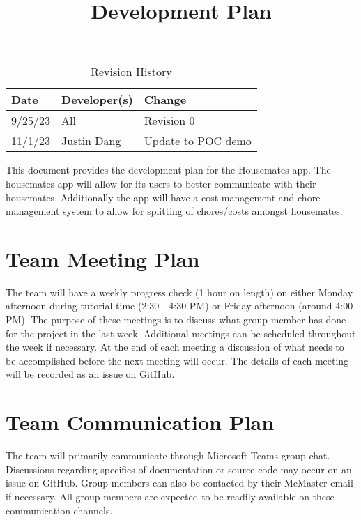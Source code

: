 \documentclass{article}
\title{Development Plan\\\progname}
\author{\authname}
\date{}
\begin{document}
\maketitle

\begin{table}[hp]
\caption{Revision History} \label{TblRevisionHistory}
\begin{tabularx}{\textwidth}{llX}
\toprule
\textbf{Date} & \textbf{Developer(s)} & \textbf{Change}\\
\midrule
9/25/23 & All & Revision 0\\
11/1/23 & Justin Dang & Update to POC demo\\
\bottomrule
\end{tabularx}
\end{table}


This document provides the development plan for the Housemates app. The housemates app will allow for its users to better communicate with their housemates.  Additionally the app will have a cost management and chore management system to allow for splitting of chores/costs amongst housemates.

\section{Team Meeting Plan}

The team will have a weekly progress check (1 hour on length) on either Monday afternoon during tutorial time (2:30 - 4:30 PM) or Friday afternoon (around 4:00 PM). The purpose of these meetings is to discuss what group member has done for the project in the last week. Additional meetings can be scheduled throughout the week if necessary. At the end of each meeting a discussion of what needs to be accomplished before the next meeting will occur. The details of each meeting will be recorded as an issue on GitHub.


\section{Team Communication Plan}

The team will primarily communicate through Microsoft Teams group chat. Discussions regarding specifics of documentation or source code may occur on an issue on GitHub. Group members can also be contacted by their McMaster email if necessary. All group members are expected to be readily available on these communication channels.
\end{document}
